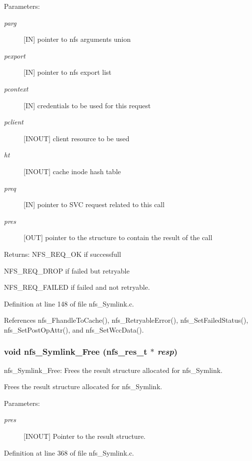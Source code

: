 \begin{Desc}
\item[Parameters:]
\begin{description}
\item[{\em parg}][IN] pointer to nfs arguments union \item[{\em pexport}][IN] pointer to nfs export list \item[{\em pcontext}][IN] credentials to be used for this request \item[{\em pclient}][INOUT] client resource to be used \item[{\em ht}][INOUT] cache inode hash table \item[{\em preq}][IN] pointer to SVC request related to this call \item[{\em pres}][OUT] pointer to the structure to contain the result of the call\end{description}
\end{Desc}
\begin{Desc}
\item[Returns:]NFS\_\-REQ\_\-OK if successfull \par
 NFS\_\-REQ\_\-DROP if failed but retryable \par
 NFS\_\-REQ\_\-FAILED if failed and not retryable. \end{Desc}


Definition at line 148 of file nfs\_\-Symlink.c.

References nfs\_\-Fhandle\-To\-Cache(), nfs\_\-Retryable\-Error(), nfs\_\-Set\-Failed\-Status(), nfs\_\-Set\-Post\-Op\-Attr(), and nfs\_\-Set\-Wcc\-Data().
\subsubsection{\setlength{\rightskip}{0pt plus 5cm}void nfs\_\-Symlink\_\-Free (nfs\_\-res\_\-t $\ast$ {\em resp})}\label{nfs__Symlink_8c_a1}


nfs\_\-Symlink\_\-Free: Frees the result structure allocated for nfs\_\-Symlink.

Frees the result structure allocated for nfs\_\-Symlink.

\begin{Desc}
\item[Parameters:]
\begin{description}
\item[{\em pres}][INOUT] Pointer to the result structure. \end{description}
\end{Desc}


Definition at line 368 of file nfs\_\-Symlink.c.